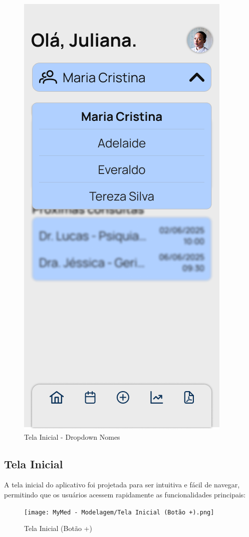 \begin{figure}[!htbp]
	\centering
	\includegraphics[width=0.6\linewidth]{MyMed - Modelagem/Tela Inicial - Dropdown Nomes.png}
	\caption{Tela Inicial - Dropdown Nomes}
	\label{tela_inicial_dropdown_nomes}
\end{figure}

\subsection{Tela Inicial}

A tela inicial do aplicativo \nomeprojeto foi projetada para ser intuitiva e fácil de navegar, permitindo que os usuários acessem rapidamente as funcionalidades principais:

\begin{figure}[!htbp]
	\centering
	\texttt{[image: MyMed - Modelagem/Tela Inicial (Botão +).png]}
	\caption{Tela Inicial (Botão +)}
	\label{tela_inicial_botao_mais}
\end{figure}

